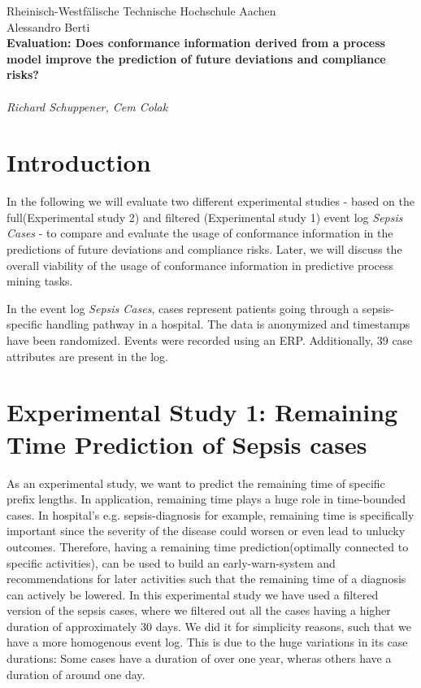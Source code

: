 \documentclass[12pt,a4paper]{article}
\begin{document}
\thispagestyle{empty}
\begin{center}
Rheinisch-Westf\"alische Technische Hochschule Aachen \\
Alessandro Berti\\[6ex]

\LARGE
\textbf{Evaluation: Does conformance information derived from a process model improve the prediction of future deviations and compliance risks?} \\[6ex]
        \\
	\textit{Richard Schuppener, Cem Colak} \\[6ex]
\end{center}

\newpage

\tableofcontents
\newpage

\section{Introduction}
In the following we will evaluate two different experimental studies - based on the full(Experimental study 2) and filtered (Experimental study 1) event log \textit{Sepsis Cases} - to compare and evaluate the usage of conformance information in the predictions of future deviations and compliance risks. Later, we will discuss the overall viability of the usage of conformance information in predictive process mining tasks.

In the event log \textit{Sepsis Cases}, cases represent patients going through a sepsis-specific handling pathway in a hospital. The data is anonymized and timestamps have been randomized. Events were recorded using an ERP. Additionally, 39 case attributes are present in the log.

\section{Experimental Study 1: Remaining Time Prediction of Sepsis cases}
As an experimental study, we want to predict the remaining time of specific prefix lengths. In application, remaining time plays a huge role in time-bounded cases. In hospital's e.g. sepsis-diagnosis for example, remaining time is specifically important since the severity of the disease could worsen or even lead to unlucky outcomes. Therefore, having a remaining time prediction(optimally connected to specific activities), can be used to build an early-warn-system and recommendations for later activities such that the remaining time of a diagnosis can actively be lowered.
In this experimental study we have used a filtered version of the sepsis cases, where we filtered out all the cases having a higher duration of approximately 30 days. We did it for simplicity reasons, such that we have a more homogenous event log. This is due to the huge variations in its case durations: Some cases have a duration of over one year, wheras others have a duration of around one day.
\end{document}
